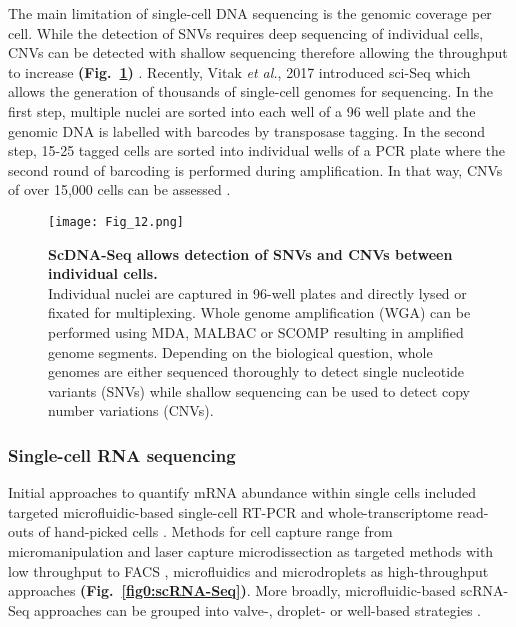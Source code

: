 The main limitation of single-cell DNA sequencing is the genomic coverage per cell. 
While the detection of SNVs requires deep sequencing of individual cells, CNVs can be detected with shallow sequencing therefore allowing the throughput to increase \textbf{(Fig.~\ref{fig0:scDNA-Seq})} \citep{Knouse2016, Baslan2015}. 
Recently, Vitak \emph{et al.}, 2017 introduced \gls{sci-Seq} which allows the generation of thousands of single-cell genomes for sequencing. 
In the first step, multiple nuclei are sorted into each well of a 96 well plate and the genomic DNA is labelled with barcodes by transposase tagging. 
In the second step, 15-25 tagged cells are sorted into individual wells of a PCR plate where the second round of barcoding is performed during amplification. In that way, CNVs of over 15,000 cells can be assessed \citep{Vitak2017}.

\begin{figure}[!h]
\centering
\texttt{[image: Fig\_12.png]}
\caption[ScDNA-Seq allows detection of SNVs and CNVs between individual cells]{\textbf{ScDNA-Seq allows detection of SNVs and CNVs between individual cells.}\\
Individual nuclei are captured in 96-well plates and directly lysed or fixated for multiplexing. Whole genome amplification (WGA) can be performed using MDA, MALBAC or SCOMP resulting in amplified genome segments. 
Depending on the biological question, whole genomes are either sequenced thoroughly to detect single nucleotide variants (SNVs) while shallow sequencing can be used to detect copy number variations (CNVs).}
\label{fig0:scDNA-Seq}
\end{figure}

\vspace{-5mm}

\subsubsection{Single-cell RNA sequencing}

Initial approaches to quantify mRNA abundance within single cells included targeted microfluidic-based single-cell \gls{RT-PCR} \citep{Warren2006} and whole-transcriptome read-outs of hand-picked cells \citep{Tang2009}. 
Methods for cell capture range from micromanipulation \citep{Grindberg2014} and laser capture microdissection \citep{Frumkin2008} as targeted methods with low throughput to  \gls{FACS} \citep{Hayashi2010, Dalerba2011, Jaitin2014}, microfluidics \citep{Trapnell2014, Treutlein2014} and microdroplets \citep{Klein2015, Macosko2015} as high-throughput approaches \textbf{(Fig.~\ref{fig0:scRNA-Seq})}. 
More broadly, microfluidic-based \gls{scRNA-Seq} approaches can be grouped into valve-, droplet- or well-based strategies \citep{Prakadan2017}. \\

